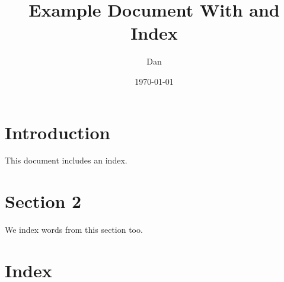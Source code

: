 \documentclass[11pt]{article}
\title{Example Document With and Index}
\author{Dan}
\date{\today}
\begin{document}
\maketitle
\section{Introduction}
This document includes an index.

\section{Section 2}
We index words from this section too.

\section{Index}
\printindex
\end{document}
